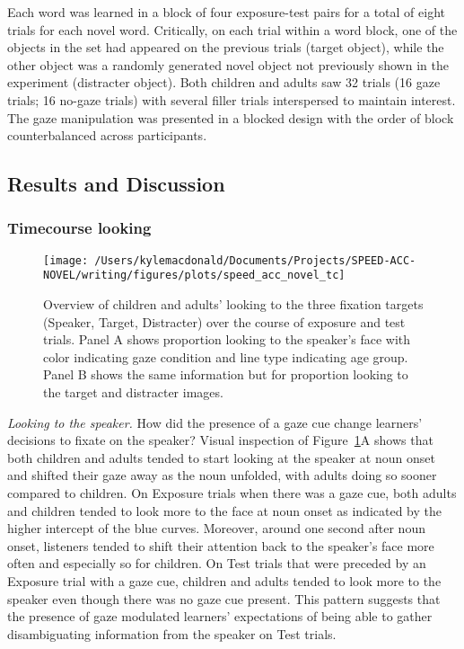 \documentclass[man,floatsintext]{apa6}
\begin{document}
Each word was learned in a block of four exposure-test pairs for a total
of eight trials for each novel word. Critically, on each trial within a
word block, one of the objects in the set had appeared on the previous
trials (target object), while the other object was a randomly generated
novel object not previously shown in the experiment (distracter object).
Both children and adults saw 32 trials (16 gaze trials; 16 no-gaze
trials) with several filler trials interspersed to maintain interest.
The gaze manipulation was presented in a blocked design with the order
of block counterbalanced across participants.

\subsection{Results and Discussion}\label{results-and-discussion-2}

\subsubsection{Timecourse looking}\label{timecourse-looking}

\begin{figure}[!t]

{\centering \texttt{[image: /Users/kylemacdonald/Documents/Projects/SPEED-ACC-NOVEL/writing/figures/plots/speed\_acc\_novel\_tc]} 

}

\caption{Overview of children and adults' looking to the three fixation targets (Speaker, Target, Distracter) over the course of exposure and test trials. Panel A shows proportion looking to the speaker's face with color indicating gaze condition and line type indicating age group. Panel B shows the same information but for proportion looking to the target and distracter images.}\label{fig:san-tc-plot}
\end{figure}

\emph{Looking to the speaker.} How did the presence of a gaze cue change
learners' decisions to fixate on the speaker? Visual inspection of
Figure~\ref{fig:san-tc-plot}A shows that both children and adults tended
to start looking at the speaker at noun onset and shifted their gaze
away as the noun unfolded, with adults doing so sooner compared to
children. On Exposure trials when there was a gaze cue, both adults and
children tended to look more to the face at noun onset as indicated by
the higher intercept of the blue curves. Moreover, around one second
after noun onset, listeners tended to shift their attention back to the
speaker's face more often and especially so for children. On Test trials
that were preceded by an Exposure trial with a gaze cue, children and
adults tended to look more to the speaker even though there was no gaze
cue present. This pattern suggests that the presence of gaze modulated
learners' expectations of being able to gather disambiguating
information from the speaker on Test trials.
\end{document}
